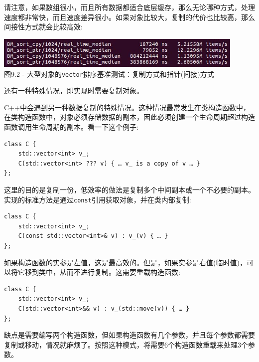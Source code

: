 请注意，如果数组很小，而且所有数据都适合底层缓存，那么无论哪种方式，处理速度都非常快，而且速度差异很小。如果对象比较大，复制的代价也比较高，那么间接性方式就会比较高效:

\begin{center}
\includegraphics[width=0.9\textwidth]{content/3/chapter9/images/2.jpg}\\
图9.2 - 大型对象的\texttt{vector}排序基准测试：复制方式和指针(间接)方式
\end{center}

还有一种特殊情况，即实现时需要复制对象。


C++中会遇到另一种数据复制的特殊情况。这种情况最常发生在类构造函数中，在类构造函数中，对象必须存储数据的副本，因此必须创建一个生命周期超过构造函数调用生命周期的副本。看一下这个例子:

\begin{lstlisting}[style=styleCXX]
class C {
	std::vector<int> v_;
	C(std::vector<int> ??? v) { … v_ is a copy of v … }
};
\end{lstlisting}

这里的目的是复制一份，低效率的做法是复制多个中间副本或一个不必要的副本。实现的标准方法是通过\texttt{const}引用获取对象，并在类内部复制:

\begin{lstlisting}[style=styleCXX]
class C {
	std::vector<int> v_;
	C(const std::vector<int>& v) : v_(v) { … }
};
\end{lstlisting}

如果构造函数的实参是左值，这是最高效的。但是，如果实参是右值(临时值)，可以将它移到类中，从而不进行复制。这需要重载构造函数:

\begin{lstlisting}[style=styleCXX]
class C {
	std::vector<int> v_;
	C(std::vector<int>&& v) : v_(std::move(v)) { … }
};
\end{lstlisting}

缺点是需要编写两个构造函数，但如果构造函数有几个参数，并且每个参数都需要复制或移动，情况就麻烦了。按照这种模式，将需要6个构造函数重载来处理3个参数。

